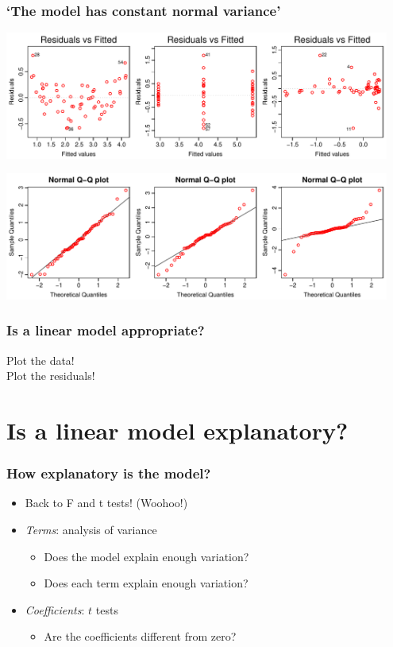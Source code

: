 \documentclass[aspectratio=43]{beamer}
\begin{document}
\begin{frame}[T]
\frametitle{`The model has constant normal variance'}

\includegraphics[width=0.95\textwidth]{BadFitResid.pdf}

\includegraphics[width=0.95\textwidth]{BadQQNorm.pdf}


\end{frame}


\frame
{\frametitle{Is a linear model appropriate?}
{\centering \Huge

Plot the data!\\
Plot the residuals!

}}


\section{Is a linear model explanatory?}

\frame
{\frametitle{How explanatory is the model?}

\begin{center}
\begin{itemize}\itemsep20pt
\item Back to F and t tests! (Woohoo!)
\item {\it Terms}: analysis of variance
\begin{itemize}
\item Does the model explain enough variation?
\item Does each term explain enough variation?
\end{itemize}
\item {\it Coefficients}: $t$ tests
\begin{itemize}
\item Are the coefficients different from zero?
\end{itemize}
\end{itemize}

\end{center}
}
\end{document}
